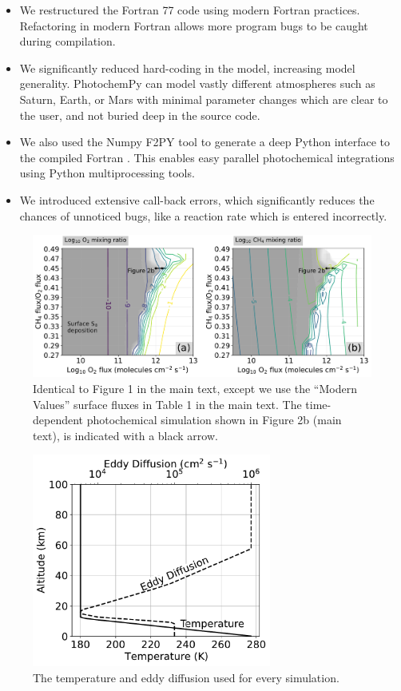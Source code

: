 \documentclass[9pt,twoside,lineno]{pnas-new}
\begin{document}
\begin{itemize}
\item
  We restructured the Fortran 77 code using modern Fortran practices.
  Refactoring in modern Fortran allows more program bugs to be caught
  during compilation.
\item
  We significantly reduced hard-coding in the model, increasing model
  generality. PhotochemPy can model vastly different
  atmospheres such as Saturn, Earth, or Mars with minimal parameter
  changes which are clear to the user, and not buried deep in the source
  code.
\item
  We also used the Numpy F2PY tool to generate a deep Python interface
  to the compiled Fortran \cite{Peterson_2009}. This enables easy parallel
  photochemical integrations using Python multiprocessing tools.
\item
  We introduced extensive call-back errors, which significantly reduces
  the chances of unnoticed bugs, like a reaction rate which is entered
  incorrectly.
\end{itemize}


\begin{figure}
\centering
\includegraphics[width=\textwidth]{figures/ModernValues_sweep.pdf}
\caption{Identical to Figure 1 in the main text, except we use the ``Modern Values'' surface fluxes in Table 1 in the main text. The time-dependent photochemical simulation shown in Figure 2b (main text), is indicated with a black arrow.}
\label{fig:case1}
\end{figure}

\begin{figure}
\centering
\includegraphics[width=0.7\textwidth]{figures/A1_temp_eddy.pdf}
\caption{The temperature and eddy diffusion used for every simulation.}
\label{fig:eddy_temp}
\end{figure}
\end{document}
